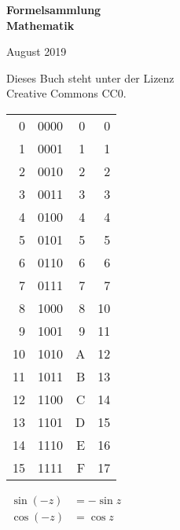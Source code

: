 \documentclass[a4paper,10pt,fleqn,twocolumn,twoside,openany]{scrbook}
\numberwithin{equation}{chapter}
\newenvironment{ttsection}{\ttfamily}{\par}
\theoremstyle{Definition}
\theoremstyle{SatzBox}
\begin{document}
\setlength{\abovedisplayskip}{6pt}
\setlength{\belowdisplayskip}{6pt}
\setlength{\abovedisplayshortskip}{6pt}
\setlength{\belowdisplayshortskip}{6pt}
\setlength{\abovecaptionskip}{2pt plus 2pt minus 1pt}

\begin{titlepage}
\centering
\phantom{x}

\vspace{20em}
{\noindent\Huge\sffamily\textbf{Formelsammlung\\
Mathematik}\par}

\vspace{2em}
{\Large August 2019}\\
\end{titlepage}

\thispagestyle{empty}

\noindent
Dieses Buch steht unter der Lizenz\\
Creative Commons CC0.
\vspace{8em}

\noindent
\begin{ttsection}
\begin{tabular}{r|r|r|r}
 0 & 0000 & 0 &  0\\
 1 & 0001 & 1 &  1\\
 2 & 0010 & 2 &  2\\
 3 & 0011 & 3 &  3\\
\noalign{\vspace{1em}}
 4 & 0100 & 4 &  4\\
 5 & 0101 & 5 &  5\\
 6 & 0110 & 6 &  6\\
 7 & 0111 & 7 &  7\\
\noalign{\vspace{1em}}
 8 & 1000 & 8 & 10\\
 9 & 1001 & 9 & 11\\
10 & 1010 & A & 12\\
11 & 1011 & B & 13\\
\noalign{\vspace{1em}}
12 & 1100 & C & 14\\
13 & 1101 & D & 15\\
14 & 1110 & E & 16\\
15 & 1111 & F & 17
\end{tabular}
\end{ttsection}

\newpage
\noindent
$\!\begin{aligned}
\sin(-z) &= -\sin z\\
\cos(-z) &= \cos z
\end{aligned}$
\vspace{1em}
\end{document}
